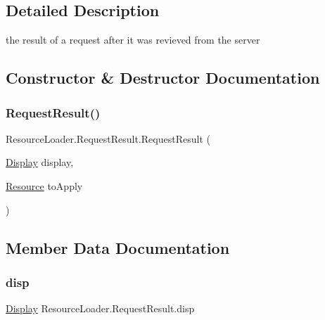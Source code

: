 \subsection{Detailed Description}
the result of a request after it was revieved from the server 



\subsection{Constructor \& Destructor Documentation}
\mbox{\label{struct_resource_loader_1_1_request_result_abd80016ba4672e51fb693cbacf32b196}} 
\subsubsection{\texorpdfstring{Request\+Result()}{RequestResult()}}
{\footnotesize\ttfamily Resource\+Loader.\+Request\+Result.\+Request\+Result (\begin{DoxyParamCaption}\item[{\mbox{\hyperlink{class_display}{Display}}}]{display,  }\item[{\mbox{\hyperlink{class_resource}{Resource}}}]{to\+Apply }\end{DoxyParamCaption})}



\subsection{Member Data Documentation}
\mbox{\label{struct_resource_loader_1_1_request_result_adde9cd4720ecbadfef0030b03cd31d00}} 
\subsubsection{\texorpdfstring{disp}{disp}}
{\footnotesize\ttfamily \mbox{\hyperlink{class_display}{Display}} Resource\+Loader.\+Request\+Result.\+disp}

